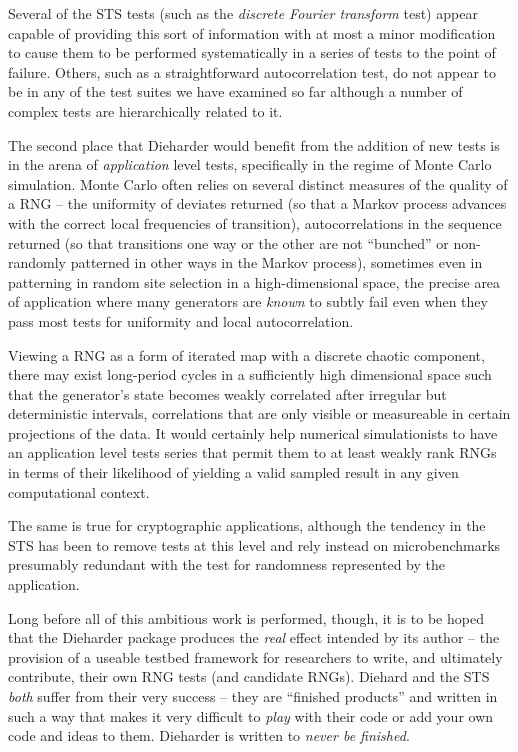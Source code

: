 \documentclass[12pt]{book}
\begin{document}
Several of the STS tests (such as the {\em discrete Fourier transform}
test) appear capable of providing this sort of information with at most
a minor modification to cause them to be performed systematically in a
series of tests to the point of failure.  Others, such as a
straightforward autocorrelation test, do not appear to be in any of the
test suites we have examined so far although a number of complex tests
are hierarchically related to it.

The second place that Dieharder would benefit from the addition of new
tests is in the arena of {\em application} level tests, specifically in
the regime of Monte Carlo simulation.  Monte Carlo often relies on
several distinct measures of the quality of a RNG -- the uniformity of
deviates returned (so that a Markov process advances with the correct
local frequencies of transition), autocorrelations in the sequence
returned (so that transitions one way or the other are not ``bunched''
or non-randomly patterned in other ways in the Markov process),
sometimes even in patterning in random site selection in a
high-dimensional space, the precise area of application where many
generators are {\em known} to subtly fail even when they pass most tests
for uniformity and local autocorrelation.  

Viewing a RNG as a form of iterated map with a discrete chaotic
component, there may exist long-period cycles in a sufficiently high
dimensional space such that the generator's state becomes weakly
correlated after irregular but deterministic intervals, correlations
that are only visible or measureable in certain projections of the data.
It would certainly help numerical simulationists to have an application
level tests series that permit them to at least weakly rank RNGs in
terms of their likelihood of yielding a valid sampled result in any
given computational context.

The same is true for cryptographic applications, although the tendency
in the STS has been to remove tests at this level and rely instead on
microbenchmarks presumably redundant with the test for randomness
represented by the application.

Long before all of this ambitious work is performed, though, it is to be
hoped that the Dieharder package produces the {\em real} effect intended
by its author -- the provision of a useable testbed framework for
researchers to write, and ultimately contribute, their own RNG tests
(and candidate RNGs).  Diehard and the STS {\em both} suffer from their
very success -- they are ``finished products'' and written in such a way
that makes it very difficult to {\em play} with their code or add your
own code and ideas to them.  Dieharder is written to {\em never be
finished}.  
\end{document}
